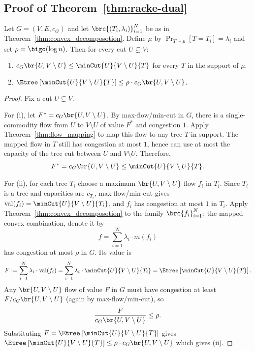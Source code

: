 \subsection{Proof of Theorem~\ref{thm:racke-dual}}\label{app:racke-proof}

\begin{theorem}
Let $G=(V,E,c_G)$ and let $\brc{(T_i,\lambda_i)}_{i=1}^{N}$ be as in Theorem~\ref{thm:convex_decomposotion}.
Define $\mu$ by $\Pr_{T\sim\mu}[T=T_i]=\lambda_i$ and set
$\rho=\bigo(\log n)$. Then for every cut $U\subsetneq V$:
\begin{enumerate}
  \item[(i)] $c_G\br{U,V\setminus U}\le \minCut{U}{V\setminus U}{T}$ for every $T$ in the support of $\mu$.
  \item[(ii)] $\Etree\left[\minCut{U}{V\setminus U}{T}\right]\le \rho\cdot c_G\br{U,V\setminus U}$.
\end{enumerate}
\end{theorem}

\begin{proof}
Fix a cut $U\subsetneq V$.

For (i), let $F^*=c_G\br{U,V\setminus U}$. By max-flow/min-cut in $G$, there is a
single-commodity flow from $U$ to $V\setminus U$ of value $F^*$ and congestion $1$.
Apply Theorem~\ref{thm:flow_mapping} to map this flow to any tree $T$ in support. The mapped
flow in $T$ still has congestion at most $1$, hence can use at most the capacity
of the tree cut between $U$ and $V\setminus U$. Therefore,
\[
  F^*=c_G\br{U,V\setminus U}\le \minCut{U}{V\setminus U}{T}.
\]

For (ii), for each tree $T_i$ choose a maximum $\br{U,V\setminus U}$ flow $f_i$ in $T_i$.
Since $T_i$ is a tree and capacities are $c_{T_i}$, max-flow/min-cut gives $
  \mathrm{val}(f_i)=\minCut{U}{V\setminus U}{T_i}$,
and $f_i$ has congestion at most $1$ in $T_i$.
Apply Theorem~\ref{thm:convex_decomposotion} to the family $\brc{f_i}_{i=1}^{N}$: the mapped convex combination, denote it by
\[
  f=\sum_{i=1}^{N} \lambda_i \cdot m(f_i)
\]
has congestion at most $\rho$ in $G$. Its value is
\[
  F:=\sum_{i=1}^{N} \lambda_i\cdot \mathrm{val}(f_i)
   =\sum_{i=1}^{N}\lambda_i \cdot \minCut{U}{V\setminus U}{T_i}
  =\Etree\left[\minCut{U}{V\setminus U}{T}\right].
\]
Any $\br{U,V\setminus U}$ flow of value $F$ in $G$ must have congestion at least
$F/c_G\br{U,V\setminus U}$ (again by max-flow/min-cut), so
\[
  \frac{F}{c_G\br{U,V\setminus U}}\le \rho.
\]
Substituting $F=\Etree\left[\minCut{U}{V\setminus U}{T}\right]$ gives $
  \Etree\left[\minCut{U}{V\setminus U}{T}\right]\le \rho\cdot c_G\br{U,V\setminus U}$ which gives (ii).
\end{proof}